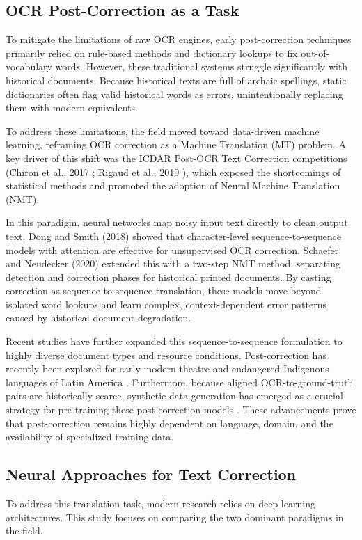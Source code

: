 \documentclass[11pt]{extarticle}
\begin{document}
\subsection{OCR Post-Correction as a Task}
To mitigate the limitations of raw OCR engines, early post-correction techniques primarily relied on rule-based methods and dictionary lookups to fix out-of-vocabulary words. However, these traditional systems struggle significantly with historical documents. Because historical texts are full of archaic spellings, static dictionaries often flag valid historical words as errors, unintentionally replacing them with modern equivalents.

To address these limitations, the field moved toward data-driven machine learning, reframing OCR correction as a Machine Translation (MT) problem. A key driver of this shift was the ICDAR Post-OCR Text Correction competitions (Chiron et al., 2017 \cite{chironicdar2017}; Rigaud et al., 2019 \cite{rigaudicdar2019}), which exposed the shortcomings of statistical methods and promoted the adoption of Neural Machine Translation (NMT). 

In this paradigm, neural networks map noisy input text directly to clean output text. Dong and Smith (2018) \cite{dong-smith-2018-multi} showed that character-level sequence-to-sequence models with attention are effective for unsupervised OCR correction. Schaefer and Neudecker (2020) \cite{schaefer-neudecker-2020-two} extended this with a two-step NMT method: separating detection and correction phases for historical printed documents. By casting correction as sequence-to-sequence translation, these models move beyond isolated word lookups and learn complex, context-dependent error patterns caused by historical document degradation. 

Recent studies have further expanded this sequence-to-sequence formulation to highly diverse document types and resource conditions. Post-correction has recently been explored for early modern theatre \cite{debaene-etal-2025-evaluating} and endangered Indigenous languages of Latin America \cite{agarwal2025ailla}. Furthermore, because aligned OCR-to-ground-truth pairs are historically scarce, synthetic data generation has emerged as a crucial strategy for pre-training these post-correction models \cite{guan2024advancing,bourne2025scrambled}. These advancements prove that post-correction remains highly dependent on language, domain, and the availability of specialized training data.

\subsection{Neural Approaches for Text Correction}
To address this translation task, modern research relies on deep learning architectures. This study focuses on comparing the two dominant paradigms in the field.
\end{document}
